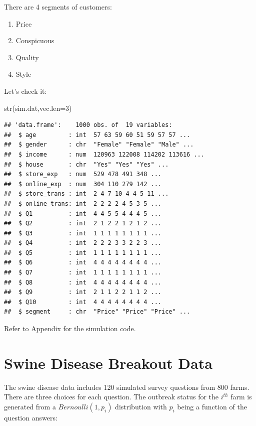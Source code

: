 \documentclass[
  12pt,
]{krantz}
\makeatletter
\newenvironment{Shaded}{\begin{snugshade}}{\end{snugshade}}
\newcommand{\AttributeTok}[1]{\textcolor[rgb]{0.61,0.61,0.61}{#1}}
\newcommand{\DecValTok}[1]{\textcolor[rgb]{0.06,0.06,0.06}{#1}}
\newcommand{\FunctionTok}[1]{\textcolor[rgb]{0,0,0}{#1}}
\newcommand{\NormalTok}[1]{#1}
\providecommand{\tightlist}{%
  \setlength{\itemsep}{0pt}\setlength{\parskip}{0pt}}
\newenvironment{kframe}{%
\medskip{}
\setlength{\fboxsep}{.8em}
 \def\at@end@of@kframe{}%
 \ifinner\ifhmode%
  \def\at@end@of@kframe{\end{minipage}}%
  \begin{minipage}{\columnwidth}%
 \fi\fi%
 \def\FrameCommand##1{\hskip\@totalleftmargin \hskip-\fboxsep
 \colorbox{shadecolor}{##1}\hskip-\fboxsep
     \hskip-\linewidth \hskip-\@totalleftmargin \hskip\columnwidth}%
 \MakeFramed {\advance\hsize-\width
   \@totalleftmargin\z@ \linewidth\hsize
   \@setminipage}}%
 {\par\unskip\endMakeFramed%
 \at@end@of@kframe}
\renewenvironment{Shaded}{\begin{kframe}}{\end{kframe}}
\makeatother
\begin{document}
There are 4 segments of customers:

\begin{enumerate}
\def\labelenumi{\arabic{enumi}.}
\tightlist
\item
  Price
\item
  Conspicuous
\item
  Quality
\item
  Style
\end{enumerate}

Let's check it:

\begin{Shaded}
\begin{Highlighting}[]
\FunctionTok{str}\NormalTok{(sim.dat,}\AttributeTok{vec.len=}\DecValTok{3}\NormalTok{)}
\end{Highlighting}
\end{Shaded}

\begin{verbatim}
## 'data.frame':    1000 obs. of  19 variables:
##  $ age         : int  57 63 59 60 51 59 57 57 ...
##  $ gender      : chr  "Female" "Female" "Male" ...
##  $ income      : num  120963 122008 114202 113616 ...
##  $ house       : chr  "Yes" "Yes" "Yes" ...
##  $ store_exp   : num  529 478 491 348 ...
##  $ online_exp  : num  304 110 279 142 ...
##  $ store_trans : int  2 4 7 10 4 4 5 11 ...
##  $ online_trans: int  2 2 2 2 4 5 3 5 ...
##  $ Q1          : int  4 4 5 5 4 4 4 5 ...
##  $ Q2          : int  2 1 2 2 1 2 1 2 ...
##  $ Q3          : int  1 1 1 1 1 1 1 1 ...
##  $ Q4          : int  2 2 2 3 3 2 2 3 ...
##  $ Q5          : int  1 1 1 1 1 1 1 1 ...
##  $ Q6          : int  4 4 4 4 4 4 4 4 ...
##  $ Q7          : int  1 1 1 1 1 1 1 1 ...
##  $ Q8          : int  4 4 4 4 4 4 4 4 ...
##  $ Q9          : int  2 1 1 2 2 1 1 2 ...
##  $ Q10         : int  4 4 4 4 4 4 4 4 ...
##  $ segment     : chr  "Price" "Price" "Price" ...
\end{verbatim}

Refer to Appendix for the simulation code.

\hypertarget{swinediseasedata}{%
\section{Swine Disease Breakout Data}\label{swinediseasedata}}

The swine disease data includes 120 simulated survey questions from 800 farms. There are three choices for each question. The outbreak status for the \(i^{th}\) farm is generated from a \(Bernoulli(1, p_i)\) distribution with \(p_i\) being a function of the question answers:
\end{document}

